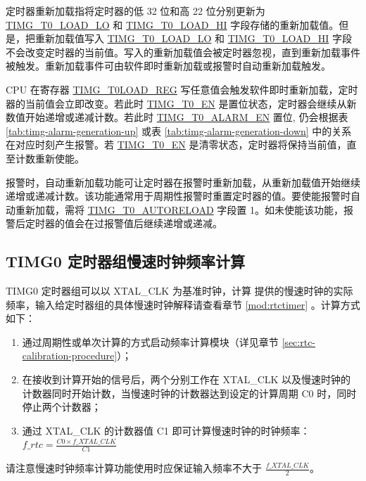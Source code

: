 \documentclass[main\_\_CN.tex]{subfiles}
\begin{document}
定时器重新加载指将定时器的低 32 位和高 22 位分别更新为 \hyperref[fielddesc:TIMGTXLOADLO]{TIMG\_T0\_LOAD\_LO} 和 \hyperref[fielddesc:TIMGTXLOADHI]{TIMG\_T0\_LOAD\_HI} 字段存储的重新加载值。但是，把重新加载值写入 \hyperref[fielddesc:TIMGTXLOADLO]{TIMG\_T0\_LOAD\_LO} 和 \hyperref[fielddesc:TIMGTXLOADHI]{TIMG\_T0\_LOAD\_HI} 字段不会改变定时器的当前值。写入的重新加载值会被定时器忽视，直到重新加载事件被触发。重新加载事件可由软件即时重新加载或报警时自动重新加载触发。

CPU 在寄存器 \hyperref[regdesc:TIMGTXLOADREG]{TIMG\_T0LOAD\_REG} 写任意值会触发软件即时重新加载，定时器的当前值会立即改变。若此时 \hyperref[fielddesc:TIMGTXEN]{TIMG\_T0\_EN} 是置位状态，定时器会继续从新数值开始递增或递减计数。若此时 \hyperref[fielddesc:TIMGTXALARMEN]{TIMG\_T0\_ALARM\_EN} 置位, 仍会根据表 \ref{tab:timg-alarm-generation-up} 或表 \ref{tab:timg-alarm-generation-down} 中的关系在对应时刻产生报警。若 \hyperref[fielddesc:TIMGTXEN]{TIMG\_T0\_EN} 是清零状态，定时器将保持当前值，直至计数重新使能。

报警时，自动重新加载功能可让定时器在报警时重新加载，从重新加载值开始继续递增或递减计数。该功能通常用于周期性报警时重置定时器的值。要使能报警时自动重新加载，需将 \hyperref[fielddesc:TIMGTXAUTORELOAD]{TIMG\_T0\_AUTORELOAD} 字段置 1。如未使能该功能，报警后定时器的值会在过报警值后继续递增或递减。

\subsection{TIMG0 定时器组慢速时钟频率计算}
\label{sec:rtc-calibration-desc}

TIMG0 定时器组可以以 XTAL\_CLK 为基准时钟，计算 \chipname{} 提供的慢速时钟的实际频率，输入给定时器组的具体慢速时钟解释请查看章节 \ref{mod:rtctimer} \textit{}。计算方式如下：

\begin{enumerate}
    \item 通过周期性或单次计算的方式启动频率计算模块（详见章节 \ref{sec:rtc-calibration-procedure}）；
    \item 在接收到计算开始的信号后，两个分别工作在 XTAL\_CLK 以及慢速时钟的计数器同时开始计数，当慢速时钟的计数器达到设定的计算周期 C0 时，同时停止两个计数器；
    \item 通过 XTAL\_CLK 的计数器值 C1 即可计算慢速时钟的时钟频率：$f\_rtc = \frac{C0 \times f\_XTAL\_CLK}{C1}$
\end{enumerate}

请注意慢速时钟频率计算功能使用时应保证输入频率不大于 $\frac{f\_XTAL\_CLK}{2}$。
\end{document}
